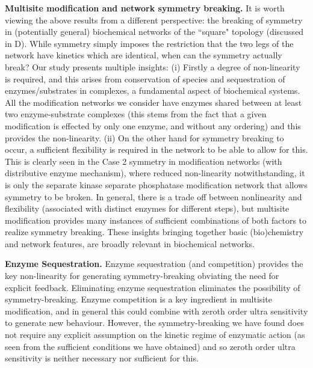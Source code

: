 \documentclass[9pt,lineno]{elife}
\begin{document}
{\bf Multisite modification and network symmetry breaking.} It is worth viewing the above results from a different perspective: the breaking of symmetry in (potentially general) biochemical networks of the ``square" topology (discussed in D). While symmetry simply imposes the restriction that the two legs of the network have kinetics which are identical, when can the symmetry actually break? Our study presents multiple insights: (i) Firstly a degree of non-linearity is required, and this arises from conservation of species and sequestration of enzymes/substrates in complexes, a fundamental aspect of biochemical systems. All the modification networks we consider have  enzymes shared between at least  two enzyme-substrate complexes (this stems from the fact that a given modification is effected by only one enzyme, and without any ordering) and this provides the non-linearity. (ii) On the other hand for symmetry breaking to occur, a sufficient flexibility is required in the network to be able to allow for this. This is clearly seen in the Case 2 symmetry in modification networks (with distributive enzyme mechanism), where reduced non-linearity notwithstanding, it is only the separate kinase separate phosphatase modification network that allows symmetry to be broken.
In general, there is a trade off between nonlinearity and flexibility (associated with distinct enzymes for different steps), but multisite modification provides many instances of sufficient combinations of both factors to realize symmetry breaking. These insights bringing together basic (bio)chemistry and network features, are broadly relevant in biochemical networks.

\textbf{Enzyme Sequestration.} Enzyme sequestration (and competition) provides the key non-linearity for generating symmetry-breaking obviating the need for explicit feedback. Eliminating enzyme sequestration eliminates the possibility of symmetry-breaking.
Enzyme competition is a key ingredient in multisite modification, and in general this could combine with zeroth order ultra sensitivity to generate new behaviour. However, the symmetry-breaking we have found does not require any explicit assumption on the kinetic regime of enzymatic action (as seen from the sufficient conditions we have obtained) and so zeroth order ultra sensitivity is neither necessary nor sufficient for this.

\end{document}
